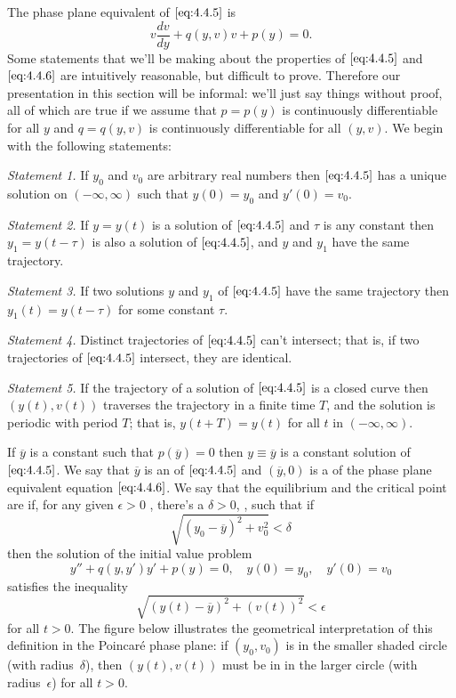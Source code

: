 \documentclass{ximera}
\begin{document}
The phase plane equivalent of $\eqref{eq:4.4.5}$ is
\begin{equation} \label{eq:4.4.6}
v\frac{dv}{dy}+q(y,v)v+p(y)=0.
\end{equation}
Some  statements that we'll be making about the properties of
$\eqref{eq:4.4.5}$ and $\eqref{eq:4.4.6}$ are intuitively reasonable, but
difficult to prove.
Therefore our presentation in this section will be informal: we'll
just say things without proof, all of which are true if we assume that
$p=p(y)$ is continuously differentiable for all $y$ and $q=q(y,v)$ is
continuously differentiable for all $(y,v)$.
 We begin with the following statements:
 
\begin{fact}

\textit{Statement 1.} If $y_0$ and $v_0$ are arbitrary real numbers then
$\eqref{eq:4.4.5}$ has a unique solution on $(-\infty,\infty)$ such that
$y(0)=y_0$ and $y'(0)=v_0$.
 
\textit{Statement 2.} If $y=y(t)$ is a solution of $\eqref{eq:4.4.5}$
and
$\tau$ is any constant then $y_1=y(t-\tau)$ is also a solution of
$\eqref{eq:4.4.5}$, and $y$ and $y_1$ have the same trajectory.
 
\textit{Statement 3.}   If two solutions $y$ and $y_1$ of
$\eqref{eq:4.4.5}$ have the same trajectory then  $y_1(t)=y(t-\tau)$
for some constant $\tau$.
 
\textit{Statement 4.} Distinct trajectories of $\eqref{eq:4.4.5}$ can't
intersect; that is, if two trajectories of $\eqref{eq:4.4.5}$
intersect,  they are identical.
 
 
\textit{Statement 5.} If the trajectory of a solution of
$\eqref{eq:4.4.5}$
is a closed curve then  $(y(t),v(t))$ traverses the
trajectory in a finite time $T$, and the solution is periodic with
period $T$; that is, $y(t+T)=y(t)$ for all $t$ in $(-\infty,\infty)$.
\end{fact}
 
 
If $\overline{y}$ is a constant such that $p(\overline{y})=0$ then
$y\equiv\overline{y}$ is a constant solution of $\eqref{eq:4.4.5}$. We say
that $\overline{y}$ is an  of $\eqref{eq:4.4.5}$ and
 $(\overline{y},0)$ is a  of the phase plane
equivalent equation $\eqref{eq:4.4.6}$. We say that the equilibrium and
the critical point are  if, for any given $\epsilon>0$
, there's a $\delta>0$,
, such that if
$$
\sqrt{(y_0-\overline{y})^2+v_0^2}<\delta
$$
then the  solution of the initial value problem
$$
y''+q(y,y')y'+p(y)=0,\quad y(0)=y_0,\quad y'(0)=v_0
$$
satisfies the inequality
$$
\sqrt{(y(t)-\overline{y})^2+(v(t))^2}<\epsilon
$$
for all $t>0$. The figure below illustrates the geometrical
interpretation of this definition in the Poincar\'e phase plane: if
$(y_0,v_0)$ is in the smaller shaded circle (with radius~$\delta$), then
$(y(t),v(t))$ must be in in the larger circle (with
radius~$\epsilon$) for all $t>0$.
\end{document}
